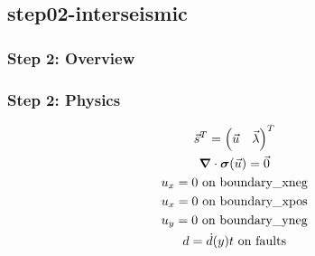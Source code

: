 \documentclass[aspectratio=169]{beamer}
\begin{document}
\subsection{step02-interseismic}

\begin{frame}
  \frametitle{Step 2: Overview}

      
\end{frame}


\begin{frame}
  \frametitle{Step 2: Physics}
  \summary{}

  \begin{minipage}{0.3\textwidth}
    {\scriptsize
    \begin{gather*}
    \vec{s}^T = \left( \vec{u} \quad \vec{\lambda} \right)^T \\
    \bm{\nabla} \cdot \bm{\sigma}(\vec{u}) = \vec{0} \\
    u_x = 0 \text{ on boundary\_xneg} \\
    u_x = 0 \text{ on boundary\_xpos} \\
    u_y = 0 \text{ on boundary\_yneg} \\
    d = \dot{d}(y) t \text{ on faults}
    \end{gather*}}
  \end{minipage}
  \hfill
  \begin{minipage}{0.67\textwidth}
  \end{minipage}
      
\end{frame}
\end{document}
